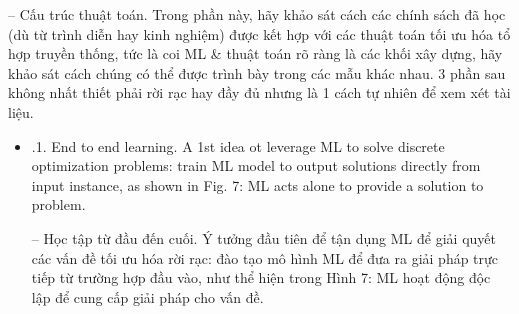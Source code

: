 \documentclass{article}
\begin{document}
\begin{itemize}
\begin{itemize}
        -- {\sf Cấu trúc thuật toán.} Trong phần này, hãy khảo sát cách các chính sách đã học (dù từ trình diễn hay kinh nghiệm) được kết hợp với các thuật toán tối ưu hóa tổ hợp truyền thống, tức là coi ML \& thuật toán rõ ràng là các khối xây dựng, hãy khảo sát cách chúng có thể được trình bày trong các mẫu khác nhau. 3 phần sau không nhất thiết phải rời rạc hay đầy đủ nhưng là 1 cách tự nhiên để xem xét tài liệu.
        \begin{itemize}
            \item {.1. End to end learning.} A 1st idea ot leverage ML to solve discrete optimization problems: train ML model to output solutions directly from input instance, as shown in {\sf Fig. 7: ML acts alone to provide a solution to problem}.

            -- {\sf Học tập từ đầu đến cuối.} Ý tưởng đầu tiên để tận dụng ML để giải quyết các vấn đề tối ưu hóa rời rạc: đào tạo mô hình ML để đưa ra giải pháp trực tiếp từ trường hợp đầu vào, như thể hiện trong {\sf Hình 7: ML hoạt động độc lập để cung cấp giải pháp cho vấn đề}.


\end{itemize}
\end{itemize}
\end{itemize}
\end{document}
